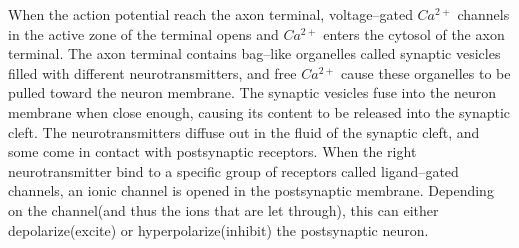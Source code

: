 


		When the action potential reach the axon terminal, voltage--gated $Ca^{2+}$ channels in the active zone of the terminal opens and $Ca^{2+}$ enters the cytosol of the axon terminal. %
		The axon terminal contains bag--like organelles called synaptic vesicles filled with different neurotransmitters, and free $Ca^{2+}$ cause these organelles to be pulled toward the neuron membrane.
		The synaptic vesicles fuse into the neuron membrane when close enough, causing its content to be released into the synaptic cleft.
		The neurotransmitters diffuse out in the fluid of the synaptic cleft, and some come in contact with postsynaptic receptors. %
		When the right neurotransmitter bind to a specific group of receptors called ligand--gated channels, an ionic channel is opened in the postsynaptic membrane.
		Depending on the channel(and thus the ions that are let through), this can either depolarize(excite) or hyperpolarize(inhibit) the postsynaptic neuron.
		\cite{PrinciplesOfNeuralScience4edKAP10}
		


